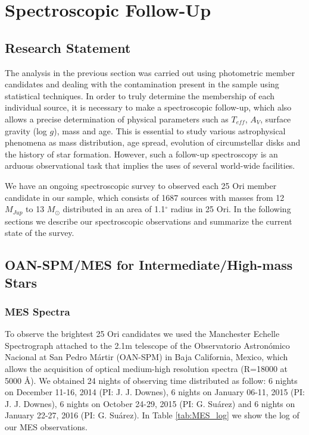 \documentclass[12pt]{article}
\begin{document}
\newpage
\section{Spectroscopic Follow-Up}
\label{sec:spectroscopy}

\subsection{Research Statement}
\label{sec:rs_spectroscopy}
The analysis in the previous section was carried out using photometric member candidates and dealing with the contamination present in the sample using statistical techniques. In order to truly determine the membership of each individual source, it is necessary to make a spectroscopic follow-up, which also allows a precise determination of physical parameters such as $T_{eff}$, $A_V$, surface gravity (log $g$), mass and age. This is essential to study various astrophysical phenomena as mass distribution, age spread, evolution of circumstellar disks and the history of star formation. However, such a follow-up spectroscopy is an arduous observational task that implies the uses of several world-wide facilities.

We have an ongoing spectroscopic survey to observed each 25 Ori member candidate in our sample, which consists of 1687 sources with masses from 12 $M_{Jup}$ to 13 $M_\odot$ distributed in an area of 1.1$^\circ$ radius in 25 Ori. In the following sections we describe our spectroscopic observations and summarize the current state of the survey.

\subsection{OAN-SPM/MES for Intermediate/High-mass Stars}
\label{sec:MES}

\subsubsection{MES Spectra}
\label{sec_echelle:spectra}
To observe the brightest 25 Ori candidates we used the Manchester Echelle Spectrograph \citep[\ac{MES}; ][]{Meaburn1984,Meaburn2003} attached to the 2.1m telescope of the Observatorio Astron\'omico Nacional at San Pedro M\'artir (\ac{OAN-SPM}) in Baja California, Mexico, which allows the acquisition of optical medium-high resolution spectra (\ac{R}=18000 at 5000 \AA). We obtained 24 nights of observing time distributed as follow: 6 nights on December 11-16, 2014 (PI: J. J. Downes), 6 nights on January 06-11, 2015 (PI: J. J. Downes), 6 nights on October 24-29, 2015 (PI: G. Su\'arez) and 6 nights on January 22-27, 2016 (PI: G. Su\'arez). In Table \ref{tab:MES_log} we show the log of our MES observations.
\end{document}
